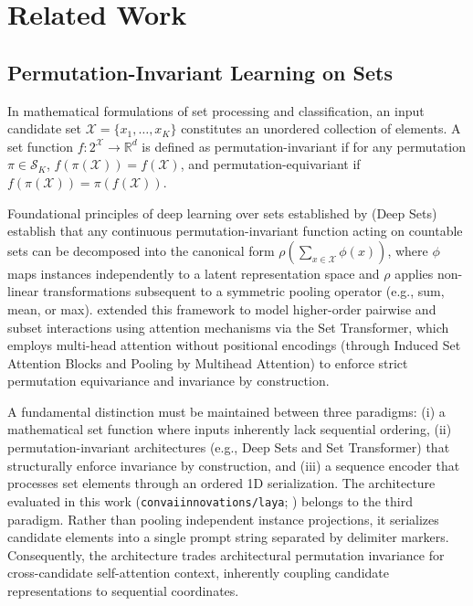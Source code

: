 \documentclass[11pt,a4paper]{article}
\begin{document}
\section{Related Work}

\subsection{Permutation-Invariant Learning on Sets}
In mathematical formulations of set processing and classification, an input candidate set $\mathcal{X} = \{x_1, \dots, x_K\}$ constitutes an unordered collection of elements. A set function $f: 2^{\mathcal{X}} \to \mathbb{R}^d$ is defined as permutation-invariant if for any permutation $\pi \in \mathcal{S}_K$, $f(\pi(\mathcal{X})) = f(\mathcal{X})$, and permutation-equivariant if $f(\pi(\mathcal{X})) = \pi(f(\mathcal{X}))$.

Foundational principles of deep learning over sets established by \citet{zaheer2017deep} (Deep Sets) establish that any continuous permutation-invariant function acting on countable sets can be decomposed into the canonical form $\rho\left( \sum_{x \in \mathcal{X}} \phi(x) \right)$, where $\phi$ maps instances independently to a latent representation space and $\rho$ applies non-linear transformations subsequent to a symmetric pooling operator (e.g., sum, mean, or max). \citet{lee2019set} extended this framework to model higher-order pairwise and subset interactions using attention mechanisms via the Set Transformer, which employs multi-head attention without positional encodings (through Induced Set Attention Blocks and Pooling by Multihead Attention) to enforce strict permutation equivariance and invariance by construction.

A fundamental distinction must be maintained between three paradigms: (i) a mathematical set function where inputs inherently lack sequential ordering, (ii) permutation-invariant architectures (e.g., Deep Sets and Set Transformer) that structurally enforce invariance by construction, and (iii) a sequence encoder that processes set elements through an ordered 1D serialization. The architecture evaluated in this work (\texttt{convaiinnovations/laya}; \citealp{laya2024}) belongs to the third paradigm. Rather than pooling independent instance projections, it serializes candidate elements into a single prompt string separated by delimiter markers. Consequently, the architecture trades architectural permutation invariance for cross-candidate self-attention context, inherently coupling candidate representations to sequential coordinates.
\end{document}
